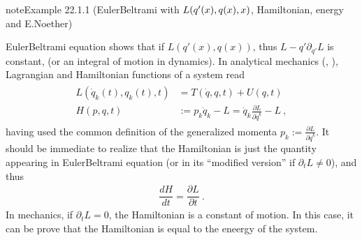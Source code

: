 \documentclass[letterpaper,10pt,english]{jupyterBook}
\begin{document}
\begin{sphinxadmonition}{note}{Example 22.1.1 (Euler\sphinxhyphen{}Beltrami with \protect\(L(q'(x),q(x),x)\protect\), Hamiltonian, energy and E.Noether)}



\sphinxAtStartPar
Euler\sphinxhyphen{}Beltrami equation shows that if \(L(q'(x), q(x))\), thus \(L - q' \partial_{q'} L\) is constant, (or an integral of motion in dynamics). In analytical mechanics (, ), Lagrangian and Hamiltonian functions of a system read
\begin{equation*}
\begin{split}\begin{aligned}
  L(\dot{q}_k(t), q_k(t), t) & = T(\dot{q},q,t) + U(q,t) \\
  H(p,q,t) & := p_k \dot{q}_k - L = \dot{q}_k \frac{\partial L}{\partial \dot{q}^k} - L \ ,
\end{aligned}\end{split}
\end{equation*}
\sphinxAtStartPar
having used the common definition of the generalized momenta \(p_k := \frac{\partial L}{\partial \dot{q}^k}\). It should be immediate to realize that the Hamiltonian is just the quantity appearing in Euler\sphinxhyphen{}Beltrami equation (or in its “modified version” if \(\partial_t L \ne 0\)), and thus
\begin{equation*}
\begin{split}\dfrac{d H}{d t} = \dfrac{\partial L}{\partial t} \ .\end{split}
\end{equation*}
\sphinxAtStartPar
In mechanics, if \(\partial_t L = 0\), the Hamiltonian is a constant of motion. In this case, it can be prove that the Hamiltonian is equal to the eneergy of the system.
\end{sphinxadmonition}
\end{document}
